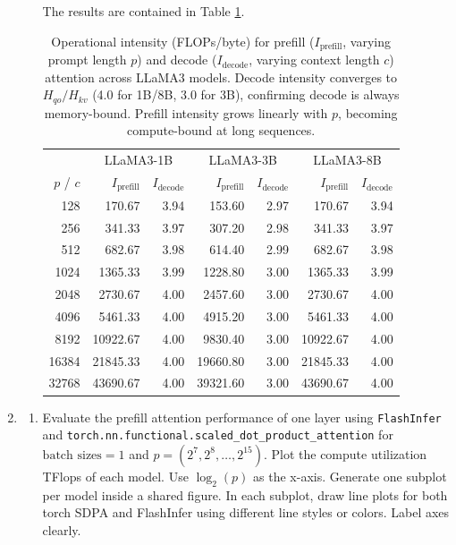 \documentclass[12pt]{article}
\begin{document}
\begin{enumerate}[label=\textbf{Q\arabic*.}]
\begin{enumerate}
        The results are contained in Table \ref{tab:op_intensity}.

\begin{table}[ht!]
\centering
\begin{tabular}{r|rr|rr|rr}
\toprule
& \multicolumn{2}{c|}{LLaMA3-1B} 
& \multicolumn{2}{c|}{LLaMA3-3B}
& \multicolumn{2}{c}{LLaMA3-8B} \\
$p$ / $c$ 
& $I_{\text{prefill}}$ & $I_{\text{decode}}$ 
& $I_{\text{prefill}}$ & $I_{\text{decode}}$ 
& $I_{\text{prefill}}$ & $I_{\text{decode}}$ \\
\midrule
128   & 170.67   & 3.94 & 153.60   & 2.97 & 170.67   & 3.94 \\
256   & 341.33   & 3.97 & 307.20   & 2.98 & 341.33   & 3.97 \\
512   & 682.67   & 3.98 & 614.40   & 2.99 & 682.67   & 3.98 \\
1024  & 1365.33  & 3.99 & 1228.80  & 3.00 & 1365.33  & 3.99 \\
2048  & 2730.67  & 4.00 & 2457.60  & 3.00 & 2730.67  & 4.00 \\
4096  & 5461.33  & 4.00 & 4915.20  & 3.00 & 5461.33  & 4.00 \\
8192  & 10922.67 & 4.00 & 9830.40  & 3.00 & 10922.67 & 4.00 \\
16384 & 21845.33 & 4.00 & 19660.80 & 3.00 & 21845.33 & 4.00 \\
32768 & 43690.67 & 4.00 & 39321.60 & 3.00 & 43690.67 & 4.00 \\
\bottomrule
\end{tabular}
\caption{Operational intensity (FLOPs/byte) for prefill ($I_{\text{prefill}}$, varying prompt
         length $p$) and decode ($I_{\text{decode}}$, varying context length $c$) attention
         across LLaMA3 models. Decode intensity converges to $H_{qo}/H_{kv}$
         (4.0 for 1B/8B, 3.0 for 3B), confirming decode is always memory-bound.
         Prefill intensity grows linearly with $p$, becoming compute-bound at long sequences.}
\label{tab:op_intensity}
\end{table}

    \end{enumerate}

    \item
    \begin{enumerate}
        \item Evaluate the prefill attention performance of one layer using \texttt{FlashInfer} and \texttt{torch.nn.functional.scaled\_dot\_product\_attention} for $\text{batch sizes} = 1$ and  $p=(2^7, 2^8, \ldots, 2^{15})$.
         Plot the compute utilization TFlops of each model.
         Use $\log_2(p)$ as the x-axis.
         Generate one subplot per model inside a shared figure.
         In each subplot,
           draw line plots for both torch SDPA and FlashInfer
           using different line styles or colors.
        Label axes clearly.


\end{enumerate}
\end{enumerate}
\end{document}
